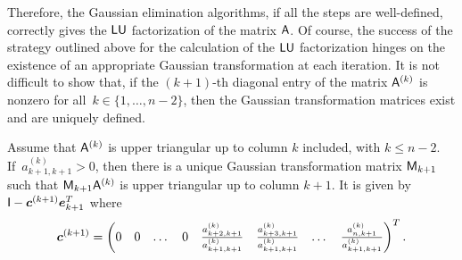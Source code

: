 Therefore, the Gaussian elimination algorithms, if all the steps are well-defined,
correctly gives the $\mathsf L \mathsf U$ factorization of the matrix $\mathsf A$.
Of course, the success of the strategy outlined above for the calculation of the $\mathsf L \mathsf U$ factorization hinges on
the existence of an appropriate Gaussian transformation at each iteration.
It is not difficult to show that,
if the $(k+1)$-th diagonal entry of the matrix $\mathsf A^{(k)}$ is nonzero for all~$k \in \{1, \dotsc, n-2\}$,
then the Gaussian transformation matrices exist and are uniquely defined.
\begin{lemma}
    \label{lemma:linear_expression_gaussian_transformations}
    Assume that $\mathsf A^{(k)}$ is upper triangular up to column $k$ included,
    with $k \leq n-2$.
    If~$a^{(k)}_{k+1,k+1} > 0$,
    then there is a unique Gaussian transformation matrix $\mathsf M_{k+1}$ such that $\mathsf M_{k+1} \mathsf A^{(k)}$ is upper triangular up to column $k + 1$.
    It is given by $\mathsf I - \mathbf{\boldsymbol{c}}^{(k+1)} \mathbf{\boldsymbol{e}}_{k+1}^T$ where
    \[
        \mathbf{\boldsymbol{c}}^{(k+1)} =
        \begin{pmatrix}
            0 & 0 & \dots & 0 & \frac{a^{(k)}_{k+2,k+1}}{a^{(k)}_{k+1,k+1}} & \frac{a^{(k)}_{k+3,k+1}}{a^{(k)}_{k+1,k+1}} & \dots & \frac{a^{(k)}_{n,k+1}}{a^{(k)}_{k+1,k+1}}
        \end{pmatrix}^T.
    \]
\end{lemma}

